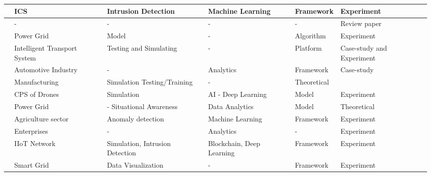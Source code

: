 \begin{longtable}{>{\small}p{0.5cm}p{2cm}p{2.9cm}p{3.0cm}p{3.0cm}p{2.0cm}}
   \cite{vargheseDigitalTwinbasedIntrusion2022} & ICS & Intrusion Detection & Machine Learning & Framework & Experiment \\
   \hline

   \cite{rajivfaleiroDigitalTwinCybersecurity2022} & - & - & - & - & Review paper \\
   \hline

   \cite{hossenDigitalTwinSelfSecurity2021} & Power Grid & Model & - & Algorithm & Experiment \\
   \hline

   \cite{luongnguyenDigitalTwinIoT2022} & Intelligent Transport System & Testing and Simulating & - & Platform & Case-study and Experiment \\
    \hline

    \cite{almeaibedDigitalTwinAnalysis2021} & Automotive Industry & - & Analytics & Framework & Case-study \\
    \hline
    
    \cite{becueCyberFactorySecuringIndustry40with2018} & Manufacturing & Simulation Testing/Training & - & Theoretical \\ 
    \hline

    \cite{wuDeepLearningDriven2022} & CPS of Drones & Simulation & AI - Deep Learning & Model & Experiment \\
    \hline

    \cite{salviCyberresilienceCriticalCyber2022} & Power Grid & - Situational Awareness & Data Analytics & Model & Theoretical \\
    \hline

    \cite{chukkapalliCyberPhysicalSystemSecurity2021} & Agriculture sector & Anomaly detection & Machine Learning & Framework & Experiment \\
    \hline

    \cite{hadarCyberDigitalTwin2020} & Enterprises & - & Analytics & - & Experiment \\
    \hline

    \cite{kumarBlockchainDeepLearning2022} & IIoT Network & Simulation, Intrusion Detection & Blockchain, Deep Learning & Framework & Experiment \\
    \hline


    \cite{williamdanilczykANGELIntelligentDigital2019} & Smart Grid & Data Visualization & - & Framework & Experiment \\
    \hline


\end{longtable}
